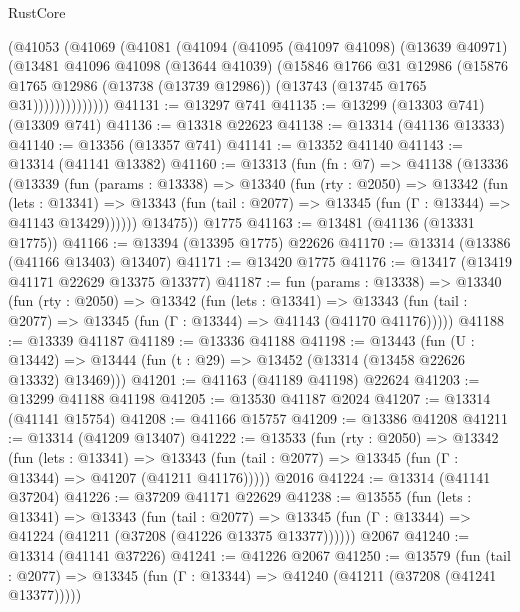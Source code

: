\begin{lexlean}{RustCore}
\begin{coremodule}
            (@41053
              (@41069
                (@41081
                  (@41094
                    (@41095
                      (@41097 @41098)
                      (@13639 @40971)
                      (@13481
                        @41096
                        @41098
                        (@13644 @41039)
                        (@15846
                          @1766
                          @31
                          @12986
                          (@15876
                            @1765
                            @12986
                            (@13738 (@13739 @12986))
                            (@13743 (@13745 @1765 @31))))))))))))))
@41131 := @13297 @741
@41135 := @13299 (@13303 @741) (@13309 @741)
@41136 := @13318 @22623
@41138 := @13314 (@41136 @13333)
@41140 := @13356 (@13357 @741)
@41141 := @13352 @41140
@41143 := @13314 (@41141 @13382)
@41160 := @13313
    (fun (fn : @7) =>
    @41138
      (@13336
        (@13339
          (fun (params : @13338) =>
          @13340
            (fun (rty : @2050) =>
            @13342
              (fun (lets : @13341) =>
              @13343 (fun (tail : @2077) => @13345 (fun (Γ : @13344) => @41143 @13429))))))
        @13475))
    @1775
@41163 := @13481 (@41136 (@13331 @1775))
@41166 := @13394 (@13395 @1775) @22626
@41170 := @13314 (@13386 (@41166 @13403) @13407)
@41171 := @13420 @1775
@41176 := @13417 (@13419 @41171 @22629 @13375 @13377)
@41187 := fun (params : @13338) =>
  @13340
    (fun (rty : @2050) =>
    @13342
      (fun (lets : @13341) =>
      @13343 (fun (tail : @2077) => @13345 (fun (Γ : @13344) => @41143 (@41170 @41176)))))
@41188 := @13339 @41187
@41189 := @13336 @41188
@41198 := @13443
    (fun (U : @13442) => @13444 (fun (t : @29) => @13452 (@13314 (@13458 @22626 @13332) @13469)))
@41201 := @41163 (@41189 @41198) @22624
@41203 := @13299 @41188 @41198
@41205 := @13530 @41187 @2024
@41207 := @13314 (@41141 @15754)
@41208 := @41166 @15757
@41209 := @13386 @41208
@41211 := @13314 (@41209 @13407)
@41222 := @13533
    (fun (rty : @2050) =>
    @13342
      (fun (lets : @13341) =>
      @13343 (fun (tail : @2077) => @13345 (fun (Γ : @13344) => @41207 (@41211 @41176)))))
    @2016
@41224 := @13314 (@41141 @37204)
@41226 := @37209 @41171 @22629
@41238 := @13555
    (fun (lets : @13341) =>
    @13343
      (fun (tail : @2077) =>
      @13345 (fun (Γ : @13344) => @41224 (@41211 (@37208 (@41226 @13375 @13377))))))
    @2067
@41240 := @13314 (@41141 @37226)
@41241 := @41226 @2067
@41250 := @13579
    (fun (tail : @2077) => @13345 (fun (Γ : @13344) => @41240 (@41211 (@37208 (@41241 @13377)))))

\end{coremodule}
\end{lexlean}
